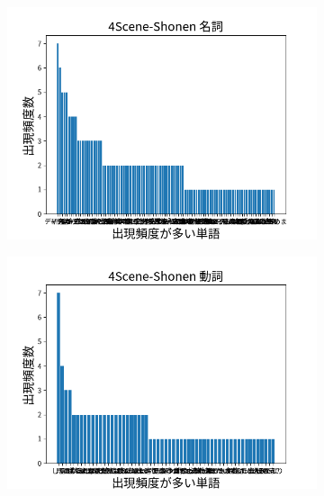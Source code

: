 \documentclass[onecolumn]{ujarticle}   %
\begin{document}
	\begin{figure}[hb]
		\centering
		\begin{subfigure}{0.49\columnwidth}
			\centering
			\includegraphics[width=1.0\columnwidth]{data/meisi_4Scene-Shonen.png}
		\end{subfigure}
		\begin{subfigure}{0.49\columnwidth}
			\centering
			\includegraphics[width=1.0\columnwidth]{data/dousi_4Scene-Shonen.png}
		\end{subfigure}
		\begin{subfigure}{0.49\columnwidth}
			\centering

\end{subfigure}
\end{figure}
\end{document}

